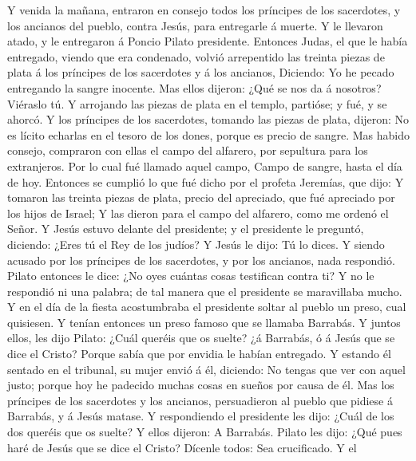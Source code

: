  Y venida la mañana, entraron en consejo todos los príncipes
de los sacerdotes, y los ancianos del pueblo, contra Jesús, para
entregarle á muerte.  Y le llevaron atado, y le entregaron á
Poncio Pilato presidente.  Entonces Judas, el que le había
entregado, viendo que era condenado, volvió arrepentido las treinta
piezas de plata á los príncipes de los sacerdotes y á los ancianos,
 Diciendo: Yo he pecado entregando la sangre inocente. Mas
ellos dijeron: ¿Qué se nos da á nosotros? Viéraslo tú.  Y
arrojando las piezas de plata en el templo, partióse; y fué, y se
ahorcó.  Y los príncipes de los sacerdotes, tomando las
piezas de plata, dijeron: No es lícito echarlas en el tesoro de los
dones, porque es precio de sangre.  Mas habido consejo,
compraron con ellas el campo del alfarero, por sepultura para los
extranjeros.  Por lo cual fué llamado aquel campo, Campo de
sangre, hasta el día de hoy.  Entonces se cumplió lo que fué
dicho por el profeta Jeremías, que dijo: Y tomaron las treinta piezas de
plata, precio del apreciado, que fué apreciado por los hijos de Israel;
 Y las dieron para el campo del alfarero, como me ordenó el
Señor.  Y Jesús estuvo delante del presidente; y el
presidente le preguntó, diciendo: ¿Eres tú el Rey de los judíos? Y Jesús
le dijo: Tú lo dices.  Y siendo acusado por los príncipes
de los sacerdotes, y por los ancianos, nada respondió. 
Pilato entonces le dice: ¿No oyes cuántas cosas testifican contra ti?
 Y no le respondió ni una palabra; de tal manera que el
presidente se maravillaba mucho.  Y en el día de la fiesta
acostumbraba el presidente soltar al pueblo un preso, cual quisiesen.
 Y tenían entonces un preso famoso que se llamaba Barrabás.
 Y juntos ellos, les dijo Pilato: ¿Cuál queréis que os
suelte? ¿á Barrabás, ó á Jesús que se dice el Cristo? 
Porque sabía que por envidia le habían entregado.  Y
estando él sentado en el tribunal, su mujer envió á él, diciendo: No
tengas que ver con aquel justo; porque hoy he padecido muchas cosas en
sueños por causa de él.  Mas los príncipes de los
sacerdotes y los ancianos, persuadieron al pueblo que pidiese á
Barrabás, y á Jesús matase.  Y respondiendo el presidente
les dijo: ¿Cuál de los dos queréis que os suelte? Y ellos dijeron: A
Barrabás.  Pilato les dijo: ¿Qué pues haré de Jesús que se
dice el Cristo? Dícenle todos: Sea crucificado.  Y el
